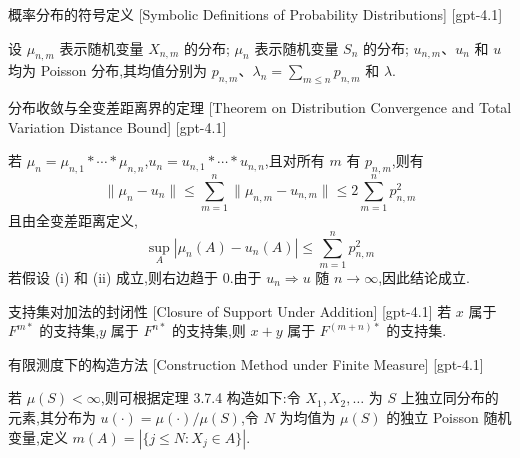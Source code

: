 \documentclass[UTF8]{ctexart}
\begin{document}
    
    
    \begin{dfn}
        {概率分布的符号定义}
        [Symbolic Definitions of Probability Distributions]
        [gpt-4.1]
        
设 $\mu_{n, m}$ 表示随机变量 $X_{n, m}$ 的分布;
$\mu_n$ 表示随机变量 $S_n$ 的分布;
$
u_{n, m}$、$
u_n$ 和 $
u$ 均为 Poisson 分布,其均值分别为 $p_{n, m}$、$\lambda_n = \sum_{m \leq n} p_{n, m}$ 和 $\lambda$.

    \end{dfn}
    
    
    
    \begin{thm}
        {分布收敛与全变差距离界的定理}
        [Theorem on Distribution Convergence and Total Variation Distance Bound]
        [gpt-4.1]
        
若 $\mu_n = \mu_{n, 1} * \cdots * \mu_{n, n}$,$
u_n = 
u_{n, 1} * \cdots * 
u_{n, n}$,且对所有 $m$ 有 $p_{n, m}$,则有
\[
\| \mu_n - 
u_n \| \leq \sum_{m = 1}^n \| \mu_{n, m} - 
u_{n, m} \| \leq 2 \sum_{m = 1}^n p_{n, m}^2
\]
且由全变差距离定义,
\[
\sup_{A} | \mu_n(A) - 
u_n(A) | \leq \sum_{m = 1}^n p_{n, m}^2
\]
若假设 (i) 和 (ii) 成立,则右边趋于 $0$.由于 $
u_n \Rightarrow 
u$ 随 $n \to \infty$,因此结论成立.

    \end{thm}
    
    
    
    \begin{ppt}
        {支持集对加法的封闭性}
        [Closure of Support Under Addition]
        [gpt-4.1]
        若 $x$ 属于 $F^{m*}$ 的支持集,$y$ 属于 $F^{n*}$ 的支持集,则 $x + y$ 属于 $F^{(m+n)*}$ 的支持集.
    \end{ppt}
    
    
    
    \begin{thm}
        {有限测度下的构造方法}
        [Construction Method under Finite Measure]
        [gpt-4.1]
        
若 $\mu(S) < \infty$,则可根据定理 3.7.4 构造如下:令 $X_1, X_2, \dots$ 为 $S$ 上独立同分布的元素,其分布为 $
u(\cdot) = \mu(\cdot)/\mu(S)$,令 $N$ 为均值为 $\mu(S)$ 的独立 Poisson 随机变量,定义 $m(A) = |\{j \leq N : X_j \in A\}|$.

    \end{thm}
    
\end{document}
